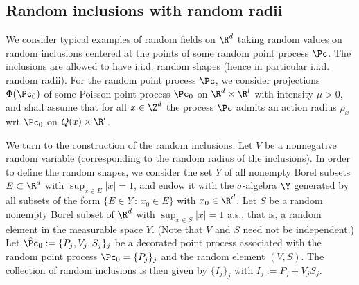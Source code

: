 \subsection{Random inclusions with random radii}\label{chap:genincl}

We consider typical examples of random fields on $\R^d$ taking random values on random inclusions centered at the points of some random point process $\Pc$. The inclusions are allowed to have i.i.d. random shapes (hence in particular i.i.d. random radii). For the random point process $\Pc$, we consider projections $\Phi(\Pc_0)$ of some Poisson point process $\Pc_0$ on $\R^d\times\R^l$ with intensity $\mu>0$, and shall assume that for all $x\in\Z^d$ the process $\Pc$ admits an action radius $\rho_x$ wrt $\Pc_0$ on $Q(x)\times\R^l$.

\medskip

We turn to the construction of the random inclusions. Let $V$ be a nonnegative random variable (corresponding to the random radius of the inclusions). In order to define the random shapes, we consider the set $Y$ of all nonempty Borel subsets $E\subset\R^d$ with $\sup_{x\in E}|x|=1$, and endow it with the $\sigma$-algebra $\Y$ generated by all subsets of the form $\{E\in Y\,:\, x_0\in E\}$ with $x_0\in\R^d$. Let $S$ be a random nonempty Borel subset of $\R^d$ with $\sup_{x\in S}|x|=1$ a.s., that is, a random element in the measurable space $Y$. (Note that $V$ and $S$ need not be independent.) Let $\hat\Pc_0:=\{P_j,V_j,S_j\}_j$ be a decorated point process associated with the random point process $\Pc_0=\{P_j\}_j$ and the random element $(V,S)$. The collection of random inclusions is then given by $\{I_j\}_j$ with $I_j:=P_j+V_jS_j$.


